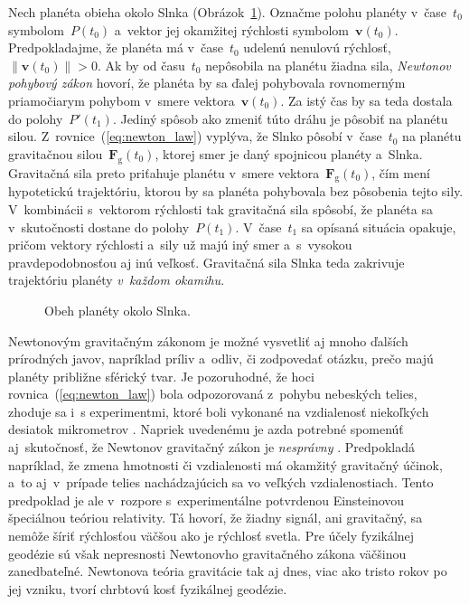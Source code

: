 \documentclass[a4paper, 12pt]{book}
\newcommand{\gidx}{\mathrm g}
\let\vec\mathbf
\begin{document}
Nech planéta obieha okolo Slnka (Obrázok~\ref{fig:orbital_motion}).  Označme 
polohu planéty v~čase~$t_0$ symbolom~$P(t_0)$ a~vektor jej okamžitej rýchlosti 
symbolom~$\vec v(t_0)$.  Predpokladajme, že planéta má v~čase~$t_0$ udelenú 
nenulovú rýchlosť, $\| \vec v(t_0) \| > 0$.  Ak by od času~$t_0$ nepôsobila na 
planétu žiadna sila, \emph{Newtonov pohybový zákon} hovorí, že planéta by sa 
ďalej pohybovala rovnomerným priamočiarym pohybom v~smere vektora~$\vec 
v(t_0)$.  Za istý čas by sa teda dostala do polohy~$P'(t_1)$.  Jediný spôsob 
ako zmeniť túto dráhu je pôsobiť na planétu silou.  
Z~rovnice~(\ref{eq:newton_law}) vyplýva, že Slnko pôsobí v~čase~$t_0$ na 
planétu gravitačnou silou~$\vec F_\gidx(t_0)$, ktorej smer je daný spojnicou 
planéty a~Slnka.  Gravitačná sila preto priťahuje planétu v~smere vektora~$\vec 
F_\gidx(t_0)$, čím mení hypotetickú trajektóriu, ktorou by sa planéta 
pohybovala bez pôsobenia tejto sily.  V~kombinácii s~vektorom rýchlosti tak 
gravitačná sila spôsobí, že planéta sa v~skutočnosti dostane do 
polohy~$P(t_1)$.  V~čase~$t_1$ sa opísaná situácia opakuje, pričom vektory 
rýchlosti a~sily už majú iný smer a~s~vysokou pravdepodobnosťou aj inú veľkosť.  
Gravitačná sila Slnka teda zakrivuje trajektóriu planéty \emph{v~každom 
okamihu}.

\begin{figure}
\centering

\caption{Obeh planéty okolo Slnka.}
\label{fig:orbital_motion}
\end{figure}

Newtonovým gravitačným zákonom je možné vysvetliť aj mnoho ďalších prírodných 
javov, napríklad príliv a~odliv, či zodpovedať otázku, prečo majú planéty 
približne sférický tvar.  Je pozoruhodné, že hoci rovnica~(\ref{eq:newton_law}) 
bola odpozorovaná z~pohybu nebeských telies, zhoduje sa i~s experimentmi, ktoré 
boli vykonané na vzdialenosť niekoľkých desiatok mikrometrov 
\parencite{Lee2020}.  Napriek uvedenému je azda potrebné spomenúť 
aj~skutočnosť, že Newtonov gravitačný zákon je \emph{nesprávny} 
\parencite{Feynman}.  Predpokladá napríklad, že zmena hmotnosti či vzdialenosti 
má okamžitý gravitačný účinok, a~to aj~v~prípade telies nachádzajúcich sa vo 
veľkých vzdialenostiach.  Tento predpoklad je ale v~rozpore s~experimentálne 
potvrdenou Einsteinovou špeciálnou teóriou relativity.  Tá hovorí, že žiadny 
signál, ani gravitačný, sa nemôže šíriť rýchlosťou väčšou ako je rýchlosť 
svetla.  Pre účely fyzikálnej geodézie sú však nepresnosti Newtonovho 
gravitačného zákona väčšinou zanedbateľné.  Newtonova teória gravitácie tak aj 
dnes, viac ako tristo rokov po jej vzniku, tvorí chrbtovú kosť fyzikálnej 
geodézie.
\end{document}
